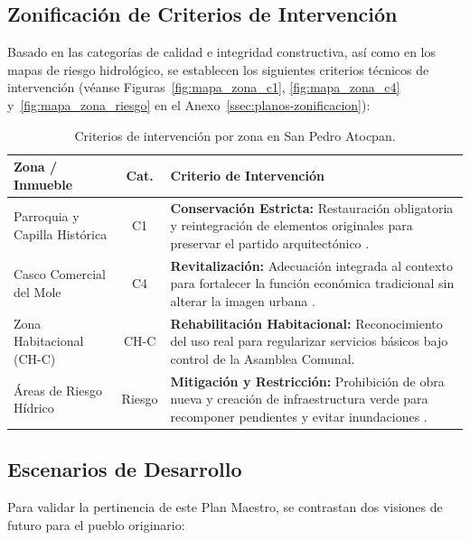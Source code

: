 \subsection{Zonificación de Criterios de Intervención}
\label{ssec:zonificacion-intervencion}

Basado en las categorías de calidad e integridad constructiva, así como en los mapas de
riesgo hidrológico, se establecen los siguientes criterios técnicos de intervención
\cite{puebla2024guia} (véanse Figuras~\ref{fig:mapa_zona_c1}, \ref{fig:mapa_zona_c4}
y~\ref{fig:mapa_zona_riesgo} en el Anexo~\ref{ssec:planos-zonificacion}):

\begin{table}[!ht]
    \centering
    \small
    \caption{Criterios de intervención por zona en San Pedro Atocpan.}
    \label{tab:criterios_zonas}
    \begin{tabular}{|p{3.0cm}|c|p{7.8cm}|}
        \hline
        \textbf{Zona / Inmueble} & \textbf{Cat.} & \textbf{Criterio de Intervención} \\ \hline
        Parroquia y Capilla Histórica & C1 & \textbf{Conservación Estricta:} Restauración obligatoria y reintegración de elementos originales para preservar el partido arquitectónico \cite{mexico1972ley, icomos1964venecia}. \\ \hline
        Casco Comercial del Mole & C4 & \textbf{Revitalización:} Adecuación integrada al contexto para fortalecer la función económica tradicional sin alterar la imagen urbana \cite{ramirez2017gestion, puebla2024guia}. \\ \hline
        Zona Habitacional (CH-C) & CH-C & \textbf{Rehabilitación Habitacional:} Reconocimiento del uso real para regularizar servicios básicos bajo control de la Asamblea Comunal. \\ \hline
        Áreas de Riesgo Hídrico & Riesgo & \textbf{Mitigación y Restricción:} Prohibición de obra nueva y creación de infraestructura verde para recomponer pendientes y evitar inundaciones \cite{balandrano2016conservacion}. \\ \hline
    \end{tabular}
\end{table}


\subsection{Escenarios de Desarrollo}
\label{ssec:escenarios-desarrollo}

Para validar la pertinencia de este Plan Maestro, se contrastan dos visiones de 
futuro para el pueblo originario:

